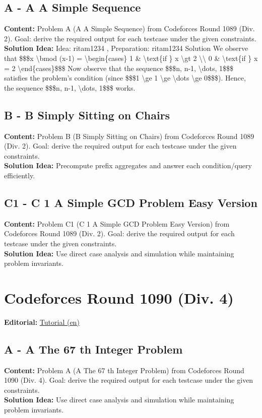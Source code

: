 \documentclass[11pt]{article}
\begin{document}
\subsection{A - A A Simple Sequence}
\textbf{Content:} Problem A (A A Simple Sequence) from Codeforces Round 1089 (Div. 2). Goal: derive the required output for each testcase under the given constraints.\\
\textbf{Solution Idea:} Idea: ritam1234 , Preparation: ritam1234 Solution We observe that \$\$\$x \textbackslash{}bmod (x-1) = \textbackslash{}begin\{cases\} 1 \& \textbackslash{}text\{if \} x \textbackslash{}gt 2 \textbackslash{}\textbackslash{} 0 \& \textbackslash{}text\{if \} x = 2 \textbackslash{}end\{cases\}\$\$\$ Now observe that the sequence \$\$\$n, n-1, \textbackslash{}dots, 1\$\$\$ satisfies the problem's condition (since \$\$\$1 \textbackslash{}ge 1 \textbackslash{}ge \textbackslash{}dots \textbackslash{}ge 0\$\$\$). Hence, the sequence \$\$\$n, n-1, \textbackslash{}dots, 1\$\$\$ works.

\subsection{B - B Simply Sitting on Chairs}
\textbf{Content:} Problem B (B Simply Sitting on Chairs) from Codeforces Round 1089 (Div. 2). Goal: derive the required output for each testcase under the given constraints.\\
\textbf{Solution Idea:} Precompute prefix aggregates and answer each condition/query efficiently.

\subsection{C1 - C 1 A Simple GCD Problem Easy Version}
\textbf{Content:} Problem C1 (C 1 A Simple GCD Problem Easy Version) from Codeforces Round 1089 (Div. 2). Goal: derive the required output for each testcase under the given constraints.\\
\textbf{Solution Idea:} Use direct case analysis and simulation while maintaining problem invariants.

\section{Codeforces Round 1090 (Div. 4)}
\textbf{Editorial:} \href{https://codeforces.com/blog/entry/152680}{Tutorial (en)}

\subsection{A - A The 67 th Integer Problem}
\textbf{Content:} Problem A (A The 67 th Integer Problem) from Codeforces Round 1090 (Div. 4). Goal: derive the required output for each testcase under the given constraints.\\
\textbf{Solution Idea:} Use direct case analysis and simulation while maintaining problem invariants.
\end{document}
